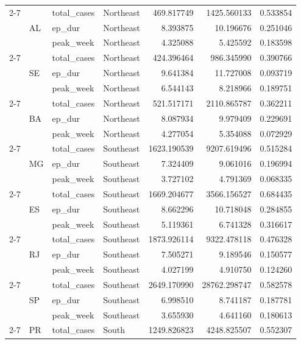 \documentclass{report}
\begin{document}
\begin{center}
\begin{center}
\begin{longtable}{llllrrr}
\cline{2-7}
 & \multirow[t]{3}{*}{AL} & total\_cases & Northeast & 469.817749 & 1425.560133 & 0.533854 \\
 &  & ep\_dur & Northeast & 8.393875 & 10.196676 & 0.251046 \\
 &  & peak\_week & Northeast & 4.325088 & 5.425592 & 0.183598 \\
\cline{2-7}
 & \multirow[t]{3}{*}{SE} & total\_cases & Northeast & 424.396464 & 986.345990 & 0.390766 \\
 &  & ep\_dur & Northeast & 9.641384 & 11.727008 & 0.093719 \\
 &  & peak\_week & Northeast & 6.544143 & 8.218966 & 0.189751 \\
\cline{2-7}
 & \multirow[t]{3}{*}{BA} & total\_cases & Northeast & 521.517171 & 2110.865787 & 0.362211 \\
 &  & ep\_dur & Northeast & 8.087934 & 9.979409 & 0.229691 \\
 &  & peak\_week & Northeast & 4.277054 & 5.354088 & 0.072929 \\
\cline{2-7}
 & \multirow[t]{3}{*}{MG} & total\_cases & Southeast & 1623.190539 & 9207.619496 & 0.515284 \\
 &  & ep\_dur & Southeast & 7.324409 & 9.061016 & 0.196994 \\
 &  & peak\_week & Southeast & 3.727102 & 4.791369 & 0.068335 \\
\cline{2-7}
 & \multirow[t]{3}{*}{ES} & total\_cases & Southeast & 1669.204677 & 3566.156527 & 0.684435 \\
 &  & ep\_dur & Southeast & 8.662296 & 10.718048 & 0.284855 \\
 &  & peak\_week & Southeast & 5.119361 & 6.741328 & 0.316617 \\
\cline{2-7}
 & \multirow[t]{3}{*}{RJ} & total\_cases & Southeast & 1873.926114 & 9322.478118 & 0.476328 \\
 &  & ep\_dur & Southeast & 7.505271 & 9.189546 & 0.150577 \\
 &  & peak\_week & Southeast & 4.027199 & 4.910750 & 0.124260 \\
\cline{2-7}
 & \multirow[t]{3}{*}{SP} & total\_cases & Southeast & 2649.170990 & 28762.298747 & 0.582578 \\
 &  & ep\_dur & Southeast & 6.998510 & 8.741187 & 0.187781 \\
 &  & peak\_week & Southeast & 3.655930 & 4.641160 & 0.180613 \\
\cline{2-7}
 & \multirow[t]{3}{*}{PR} & total\_cases & South & 1249.826823 & 4248.825507 & 0.552307 \\

\end{longtable}
\end{center}
\end{center}
\end{document}
